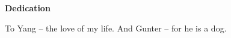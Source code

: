 {}
\begin{center}
  \textbf{Dedication}

  To Yang -- the love of my life.
  And Gunter -- for he is a dog.
\end{center}

\cleardoublepage

